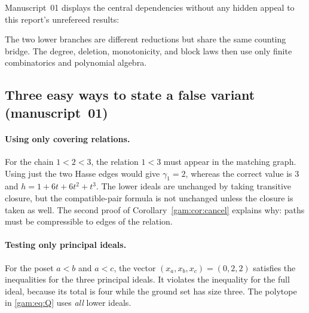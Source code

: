 \documentclass[11pt]{article}
\numberwithin{equation}{section}
\theoremstyle{definition}
\begin{document}
Manuscript~01 displays the central dependencies without any hidden appeal to
this report's unrefereed results:
\begin{center}
\end{center}
The two lower branches are different reductions but share the same counting
bridge. The degree, deletion, monotonicity, and block laws then use only
finite combinatorics and polynomial algebra.

\subsection{Three easy ways to state a false variant (manuscript~01)}
\paragraph{Using only covering relations.}
For the chain $1<2<3$, the relation $1<3$ must appear in the matching graph.
Using just the two Hasse edges would give $\gamma_1=2$, whereas the correct
value is $3$ and $h=1+6t+6t^2+t^3$. The lower ideals are unchanged by taking
transitive closure, but the compatible-pair formula is not unchanged unless
the closure is taken as well. The second proof of
Corollary~\ref{gam:cor:cancel} explains why: paths must be compressible to
edges of the relation.

\paragraph{Testing only principal ideals.}
For the poset $a<b$ and $a<c$, the vector $(x_a,x_b,x_c)=(0,2,2)$ satisfies
the inequalities for the three principal ideals. It violates the inequality
for the full ideal, because its total is four while the ground set has size
three. The polytope in \eqref{gam:eq:Q} uses \emph{all} lower ideals.
\end{document}
